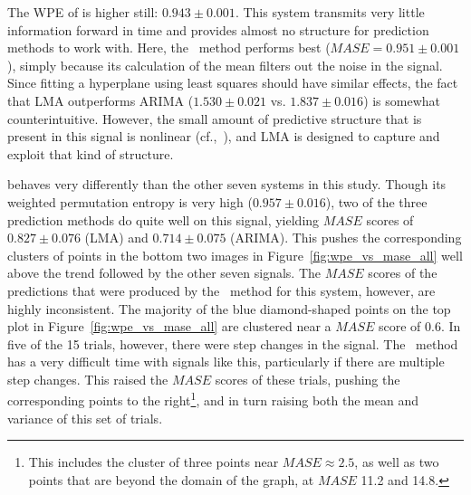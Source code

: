 The WPE of \gcc is higher still: $0.943 \pm 0.001$.  This system
transmits very little information forward in time and provides almost
no structure for prediction methods to work with.  Here, the \naive
~method performs best ($MASE=0.951 \pm 0.001$), simply because its
calculation of the mean filters out the noise in the signal.  Since
fitting a hyperplane using least squares should have similar effects,
the fact that LMA outperforms ARIMA ($1.530 \pm 0.021$ vs. $1.837 \pm
0.016$) is somewhat counterintuitive.  However, the small amount of
predictive structure that is present in this signal is nonlinear
(cf.,~\cite{mytkowicz09}), and LMA is designed to capture and exploit
that kind of structure.

\svdone behaves very differently than the other seven systems in this
study.  Though its weighted permutation entropy is very high ($0.957
\pm 0.016$), two of the three prediction methods do quite well on this
signal, yielding $MASE$ scores of $0.827 \pm 0.076$ (LMA) and $0.714
\pm 0.075$ (ARIMA).  This pushes the corresponding clusters of points
in the bottom two images in Figure~\ref{fig:wpe_vs_mase_all} well
above the trend followed by the other seven signals.  The $MASE$
scores of the predictions that were produced by the \naive ~method for
this system, however, are highly inconsistent.  The majority of the
blue diamond-shaped points on the top plot in
Figure~\ref{fig:wpe_vs_mase_all} are clustered near a $MASE$ score of
0.6.  In five of the 15 \svdone trials, however, there were step
changes in the signal.  The \naive ~method has a very difficult time
with signals like this, particularly if there are multiple step
changes.  This raised the $MASE$ scores of these trials, pushing the
corresponding points to the right\footnote{This includes the cluster
  of three points near $MASE \approx 2.5$, as well as two points that
  are beyond the domain of the graph, at $MASE$ 11.2 and 14.8.}, and
in turn raising both the mean and variance of this set of trials.

